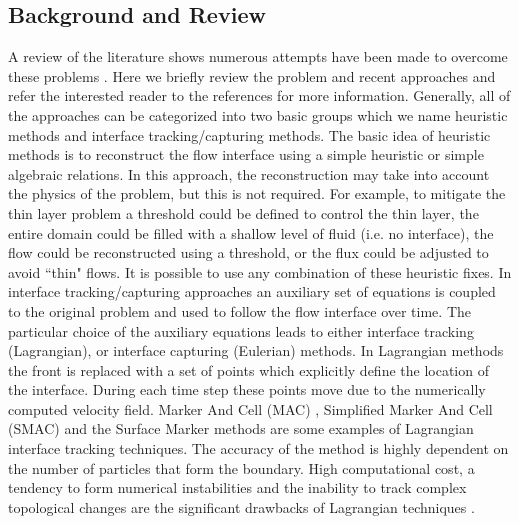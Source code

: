 \documentclass[review]{elsarticle}
\begin{document}
\subsection{Background and Review}
A review of the literature shows numerous attempts have been made to overcome these problems \cite{Medeiros2013,Balzano1998,Aureli2008,Bunya2009,Casulli2009,
Kesserwani2011,DAlpaos2007,Castro2005}.
Here we briefly review the problem and recent approaches and refer the interested reader to the references for more information.
Generally, all of the approaches can be 
categorized into two basic groups which we name heuristic methods and interface tracking/capturing methods.
The basic idea of heuristic methods  \cite{Aureli2008,Bunya2009,Castro2005,Kesserwani2011} is to reconstruct the flow interface using a
simple heuristic or simple algebraic relations. In this approach, the reconstruction may take into account the physics of the problem, but this is not required. 
For example, to mitigate the thin layer problem a threshold could be defined to control the thin layer, the entire domain could be filled with a shallow level of fluid (i.e. no interface),
the flow could be reconstructed using a threshold, or the flux could be adjusted to avoid ``thin" flows. It is possible to use any combination of these heuristic fixes.
In interface tracking/capturing approaches
an auxiliary set of equations is coupled to the original problem and used to follow the flow interface over time. 
The particular choice of the auxiliary equations leads to either interface tracking (Lagrangian), or interface capturing (Eulerian) methods.
In Lagrangian methods the front is replaced with a set of  points   which explicitly define the location of the interface.
During each time step these points move due to the numerically computed velocity field.
Marker And Cell (MAC) \cite{Harlow1965}, Simplified Marker And Cell (SMAC) \cite{Cheng1995} and the Surface Marker \citep{Wrobel1991} methods are some examples of Lagrangian interface tracking techniques.
The accuracy of the method is highly dependent on the number of particles that form the boundary.
High computational cost, a tendency to form numerical instabilities and the inability to track complex topological changes are the significant drawbacks of Lagrangian techniques
 \cite{Glimm1995,Unverdi1992,Osher1988,Anderson1998,hirt1981vfv}.
\end{document}
